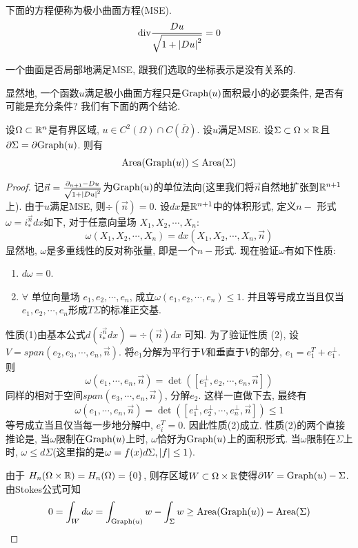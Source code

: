 下面的方程便称为极小曲面方程(MSE).
\begin{equation}
    {\text{div}} \frac{Du}{\sqrt{1+\left | Du \right |^2}} =0
\end{equation}
\begin{remark}
    一个曲面是否局部地满足MSE, 跟我们选取的坐标表示是没有关系的.
\end{remark}
显然地, 一个函数$u$满足极小曲面方程只是$\text{Graph}(u)$面积最小的必要条件, 是否有可能是充分条件? 我们有下面的两个结论.
\begin{proposition}\label{mse_min1}
    设$\Omega \subset \mathbb{R}^n$是有界区域, $u \in C^2(\Omega)\cap C(\overline{\Omega})$. 设$u$满足MSE. 设$\Sigma \subset \Omega \times \mathbb{R}$且$\partial \Sigma = \partial \text{Graph}(u)$. 则有
    \begin{equation}
        \text{Area}(\text{Graph}(u)) \le \text{Area}(\Sigma)
    \end{equation}
\end{proposition}
\begin{proof}
    记$\vec{n}= \frac{\partial_{n+1}-Du}{\sqrt{1+\left | Du \right |^2}}$为$\text{Graph}(u)$的单位法向(这里我们将$\vec{n}$自然地扩张到$\mathbb{R}^{n+1}$上). 由于$u$满足MSE, 则$\div(\vec{n})=0$. 设$dx$是$\mathbb{R}^{n+1}$中的体积形式, 定义$n-$ 形式 $\omega=i_*^{\vec{n}}dx$如下, 对于任意向量场 $X_1,X_2, \cdots,X_n$:
    \begin{equation}
        \omega(X_1,X_2,\cdots,X_n)=dx(X_1,X_2,\cdots,X_n,\vec{n})
    \end{equation}
    显然地, $\omega$是多重线性的反对称张量, 即是一个$n-$形式.  现在验证$\omega$有如下性质:
    \begin{enumerate}
        \item $d\omega=0$.
        \item $\forall$ 单位向量场 $e_1,e_2,\cdots,e_n$, 成立$\omega(e_1,e_2,\cdots,e_n) \le 1$. 并且等号成立当且仅当$e_1,e_2,\cdots,e_n$形成$T\Sigma$的标准正交基.
    \end{enumerate}
    性质(1)由基本公式$d(i_*^{\vec{n}}dx)=\div(\vec{n})dx$ 可知.  为了验证性质 (2), 设$V=span(e_2,e_3,\cdots,e_n,\vec{n})$. 将$e_1$分解为平行于$V$和垂直于$V$的部分, $e_1=e_1^T+e_1^{\perp}$. 则
    \begin{equation}
        \omega(e_1,\cdots,e_n,\vec{n})=\det([e_1^{\perp}, e_2,\cdots,e_n,\vec{n}])
    \end{equation}
    同样的相对于空间$span(e_3,\cdots,e_n,\vec{n})$, 分解$e_2$. 这样一直做下去, 最终有
    \begin{equation}
        \omega(e_1,\cdots,e_n,\vec{n})=\det([e_1^\perp, e_2^\perp,\cdots,e_n^\perp,\vec{n}]) \le 1
    \end{equation}
    等号成立当且仅当每一步地分解中, $e_i^T=0$. 因此性质(2)成立. 性质(2)的两个直接推论是, 当$\omega$限制在$\text{Graph}(u)$上时, $\omega$恰好为$\text{Graph}(u)$上的面积形式. 当$\omega$限制在$\Sigma$上时, $\omega \le d\Sigma$(这里指的是$\omega=f(x)d\Sigma, \left | f \right |\le 1$). 
    \par 由于 $H_n(\Omega \times \mathbb{R})=H_n(\Omega)=\{0\}$, 则存区域$W \subset \Omega \times \mathbb{R}$使得$\partial W=\text{Graph}(u)-\Sigma$. 由Stokes公式可知
    \begin{equation}
        0=\int_W d\omega= \int_{\text{Graph}(u)}w-\int_{\Sigma}w \ge \text{Area}(\text{Graph}(u)) - \text{Area}(\Sigma)
    \end{equation}
\end{proof}
